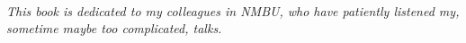 \thispagestyle{empty}
~\\[3in]
\begin{fullwidth}
\begin{center}
\Large \itshape This book is dedicated to my colleagues in NMBU, who have patiently listened my, sometime maybe too complicated, talks.
\end{center}
\end{fullwidth}
